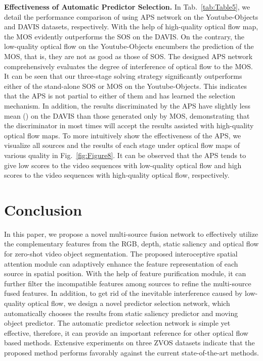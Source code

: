 \documentclass[sigconf]{acmart}
\begin{document}
\textbf{Effectiveness of Automatic Predictor Selection.} In Tab.~\ref{tab:Table5}, we detail the performance comparison of using APS network on the Youtube-Objects and DAVIS datasets, respectively. With the help of high-quality optical flow map, the MOS evidently outperforms the SOS on the DAVIS. On the contrary, the low-quality optical flow on the Youtube-Objects encumbers the prediction of the MOS, that is, they are not as good as those of SOS. The designed APS network comprehensively evaluates the degree of interference of optical flow to the MOS. 
It can be seen that our three-stage solving strategy significantly outperforms either of the stand-alone SOS or MOS on the Youtube-Objects.
This indicates that the APS is not partial to either of them and has learned the selection mechanism.
In addition, the results discriminated by the APS have slightly less mean  () on the DAVIS than those generated only by MOS, demonstrating that the discriminator in most times will accept the results assisted with high-quality optical flow maps.
To more intuitively show the effectiveness of the APS, we visualize all sources and the results of each stage under optical flow maps of various quality in Fig.~\ref{fig:Figure8}. It can be observed that the APS tends to give low scores to the video sequences with low-quality optical flow and high scores to the video sequences with high-quality optical flow, respectively.



\section{Conclusion}
In this paper, we propose a novel multi-source fusion network to effectively utilize the complementary features from the RGB, depth, static saliency and optical flow for zero-shot video object segmentation. The proposed interoceptive spatial attention module can adaptively enhance the feature representation of each source in spatial position. With the help of feature purification module, it can further filter the incompatible features among sources to refine the multi-source fused features. In addition, to get rid of the inevitable interference caused by low-quality optical flow, we design a novel predictor selection network, which automatically chooses the results from static saliency predictor and moving object predictor.
The automatic predictor selection network is simple yet effective, therefore, it can provide an important reference for other optical flow based methods. Extensive experiments on three ZVOS datasets indicate that the proposed method performs favorably against the current state-of-the-art methods.
\end{document}
